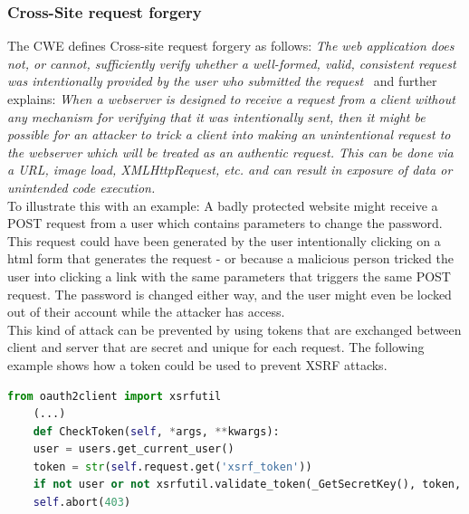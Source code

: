 \documentclass[
a4paper,
pagesize,
pdftex,
12pt,
ngerman,
fleqn,
final,
]{scrartcl}
\begin{document}
	\subsubsection{Cross-Site request forgery}
	The CWE defines Cross-site request forgery as follows: \textit{The web application does not, or cannot, sufficiently verify whether a well-formed, valid, consistent request was intentionally provided by the user who submitted the request}~\cite{CommonWeaknessEnumeration.19.9.2019b} and further explains: \textit{When a webserver is designed to receive a request from a client without any mechanism for verifying that it was intentionally sent, then it might be possible for an attacker to trick a client into making an unintentional request to the webserver which will be treated as an authentic request. This can be done via a URL, image load, XMLHttpRequest, etc. and can result in exposure of data or unintended code execution.}\\
	
	To illustrate this with an example: A badly protected website might receive a POST request from a user which contains parameters to change the password. This request could have been generated by the user intentionally clicking on a html form that generates the request - or because a malicious person tricked the user into clicking a link with the same parameters that triggers the same POST request. The password is changed either way, and the user might even be locked out of their account while the attacker has access.\\
	
	This kind of attack can be prevented by using tokens that are exchanged between client and server that are secret and unique for each request. The following example shows how a token could be used to prevent XSRF attacks.\\
	
	
	\begin{lstlisting}[language=Python, showstringspaces=False]
	from oauth2client import xsrfutil
	(...)
	def CheckToken(self, *args, **kwargs):
	user = users.get_current_user()
	token = str(self.request.get('xsrf_token'))
	if not user or not xsrfutil.validate_token(_GetSecretKey(), token, user.user_id()):
	self.abort(403)
	
	\end{lstlisting}
	
\end{document}
